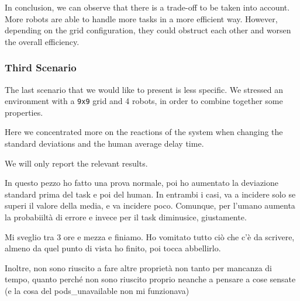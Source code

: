 In conclusion, we can observe that there is a trade-off to be taken into account. More robots are able to handle more tasks in a more efficient way. However, depending on the grid configuration, they could obstruct each other and worsen the overall efficiency.

\subsubsection{Third Scenario}
The last scenario that we would like to present is less specific. We stressed an environment with a \texttt{9x9} grid and 4 robots, in order to combine together some properties.

Here we concentrated more on the reactions of the system when changing the standard deviations and the human average delay time.

We will only report the relevant results.

In questo pezzo ho fatto una prova normale, poi ho aumentato la deviazione standard prima del task e poi del human. In entrambi i casi, va a incidere solo se superi il valore della media, e va incidere poco. Comunque, per l'umano aumenta la probabiiltà di errore e invece per il task diminusice, giustamente.

Mi sveglio tra 3 ore e mezza e finiamo. Ho vomitato tutto ciò che c'è da scrivere, almeno da quel punto di vista ho finito, poi tocca abbellirlo.

Inoltre, non sono riuscito a fare altre proprietà non tanto per mancanza di tempo, quanto perché non sono riuscito proprio neanche a pensare a cose sensate (e la cosa del pods\_unavailable non mi funzionava)